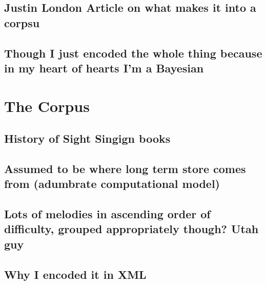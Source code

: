 \documentclass[]{book}
\begin{document}
\hypertarget{justin-london-article-on-what-makes-it-into-a-corpsu}{%
\subsection{Justin London Article on what makes it into a corpsu}\label{justin-london-article-on-what-makes-it-into-a-corpsu}}

\hypertarget{though-i-just-encoded-the-whole-thing-because-in-my-heart-of-hearts-im-a-bayesian}{%
\subsection{Though I just encoded the whole thing because in my heart of hearts I'm a Bayesian}\label{though-i-just-encoded-the-whole-thing-because-in-my-heart-of-hearts-im-a-bayesian}}

\hypertarget{the-corpus}{%
\section{The Corpus}\label{the-corpus}}

\hypertarget{history-of-sight-singign-books}{%
\subsection{History of Sight Singign books}\label{history-of-sight-singign-books}}

\hypertarget{assumed-to-be-where-long-term-store-comes-from-adumbrate-computational-model}{%
\subsection{Assumed to be where long term store comes from (adumbrate computational model)}\label{assumed-to-be-where-long-term-store-comes-from-adumbrate-computational-model}}

\hypertarget{lots-of-melodies-in-ascending-order-of-difficulty-grouped-appropriately-though-utah-guy}{%
\subsection{Lots of melodies in ascending order of difficulty, grouped appropriately though? Utah guy}\label{lots-of-melodies-in-ascending-order-of-difficulty-grouped-appropriately-though-utah-guy}}

\hypertarget{why-i-encoded-it-in-xml}{%
\subsection{Why I encoded it in XML}\label{why-i-encoded-it-in-xml}}
\end{document}
